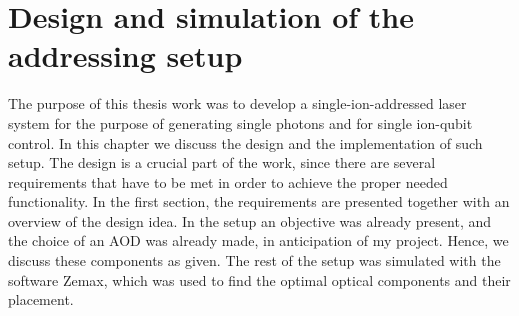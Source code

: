 \chapter{Design and simulation of the addressing setup}
The purpose of this thesis work was to develop a single-ion-addressed laser system for the purpose of generating single photons and for single ion-qubit control. In this chapter we discuss the design and the implementation of such setup. The design is a crucial part of the work, since there are several requirements that have to be met in order to achieve the proper needed functionality. In the first section, the requirements are presented together with an overview of the design idea. In the setup an objective was already present, and the choice of an AOD was already made, in anticipation of my project. Hence, we discuss these components as given. The rest of the setup was simulated with the software Zemax, which was used to find the optimal optical components and their placement.
